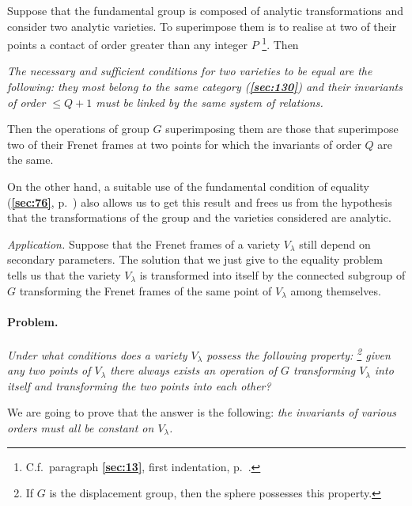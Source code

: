 \documentclass[leqno,11pt]{book}
\numberwithin{equation}{chapter}
\theoremstyle{shape1}
\theoremstyle{shapesmall}
\newcommand{\fsref}[1]{{\rm\textsection\textbf{\ref{sec:#1}}}}
\newcommand{\somespace}{\vspace{9pt}}
\begin{document}
Suppose that the fundamental group is composed of analytic transformations and consider two analytic varieties. To superimpose them is to realise at two of their points a contact of order greater than any integer $P$ \footnote{C.f.~paragraph \fsref{13}, first indentation, p.~\pageref{sec:13}.}. Then

\somespace

\emph{The necessary and sufficient conditions for two varieties to be equal are the following: they most belong to the same category \emph{(\fsref{130})} and their invariants of order $\le Q+1$ must be linked by the same system of relations.}

\somespace

Then the operations of group $G$ superimposing them are those that superimpose two of their Frenet frames at two points for which the invariants of order $Q$ are the same.

On the other hand, a suitable use of the fundamental condition of equality (\fsref{76}, p.~\pageref{sec:76}) also allows us to get this result and frees us from the hypothesis that the transformations of the group and the varieties considered are analytic.

\somespace

\emph{Application.} Suppose that the Frenet frames of a variety $V_{\lambda}$ still depend on secondary parameters. The solution that we just give to the equality problem tells us that the variety $V_{\lambda}$ is transformed into itself by the connected subgroup of $G$ transforming the Frenet frames of the same point of $V_{\lambda}$ among themselves.


\paragraph{Problem.}
\label{sec:132}
\emph{Under what conditions does a variety $V_{\lambda}$ possess the following property: \footnote{If $G$ is the displacement group, then the sphere possesses this property.} given any two points of $V_{\lambda}$ there always exists an operation of $G$ transforming $V_{\lambda}$ into itself and transforming the two points into each other?}

\somespace

We are going to prove that the answer is the following: \emph{the invariants of various orders must all be constant on $V_{\lambda}$.}
\end{document}
